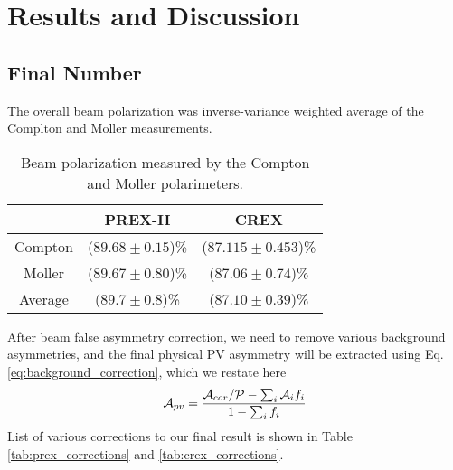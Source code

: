 \chapter{Results and Discussion}

\section{Final Number}

\begin{comment}
    Measured asymmetry 
    $\downarrow$
    correct for Coulomb distortions 
    $\downarrow$
    Weak density at one $Q^2$
    $\downarrow$
    small correction for $G_E^n$, $G_E^s$
    $\downarrow$
    Neutron density at one $Q^2$
    $\downarrow$
    assume suface thickness good to 25\% (MFT)
    $\downarrow$
    $R_n$

\end{comment}
The overall beam polarization was inverse-variance weighted average of the Complton
and Moller measurements.
\begin{table}[!h]
    \centering
    \begin{tabular}{c | c c}
	\hline
	    & PREX-II	& CREX	\\
	\hline
	Compton	& ($89.68 \pm 0.15$)\%  & ($87.115 \pm 0.453$)\%	\\
	Moller	& ($89.67 \pm 0.80$)\%	& ($87.06 \pm 0.74$)\%  \\
	\hline
	Average	& ($89.7 \pm 0.8$)\%	& ($87.10 \pm 0.39$)\%	\\
	\hline
    \end{tabular}
    \caption{Beam polarization measured by the Compton and Moller polarimeters.}
\end{table}

After beam false asymmetry correction, we need to remove various background 
asymmetries, and the final physical PV asymmetry will be extracted using 
Eq. \ref{eq:background_correction}, which we restate here 
\begin{equation*}
    \mathcal{A}_{pv} = \frac{\mathcal{A}_{cor}/\mathcal{P} - \sum_i \mathcal{A}_i f_i}{1 - \sum_i f_i}
\end{equation*}
List of various corrections to our final result is shown in 
Table \ref{tab:prex_corrections} and \ref{tab:crex_corrections}.

